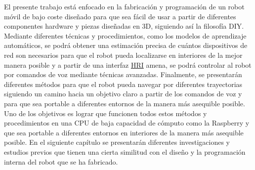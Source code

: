 El presente trabajo está enfocado en la fabricación y programación de un robot móvil de bajo coste diseñado para que sea fácil de usar a partir de diferentes componentes hardware y piezas diseñadas en 3D, siguiendo así la filosofía DIY. Mediante diferentes técnicas y procedimientos, como los modelos de aprendizaje automáticos, se podrá obtener una estimación precisa de cuántos dispositivos de red son necesarios para que el robot pueda localizarse en interiores de la mejor manera posible y a partir de una interfaz \hyperlink{HRI}{HRI} amena, se podrá controlar al robot por comandos de voz mediante técnicas avanzadas. Finalmente, se presentarán diferentes métodos para que el robot pueda navegar por diferentes trayectorias siguiendo un camino hacia un objetivo claro a partir de los comandos de voz y para que sea portable a diferentes entornos de la manera más asequible posible. Uno de los objetivos es lograr que funcionen todos estos métodos y procedimientos en una CPU de baja capacidad de cómputo como la Raspberry y que sea portable a diferentes entornos en interiores de la manera más asequible posible. En el siguiente capítulo se presentarán diferentes investigaciones y estudios previos que tienen una cierta similitud con el diseño y la programación interna del robot que se ha fabricado.

\vspace{15cm} %







